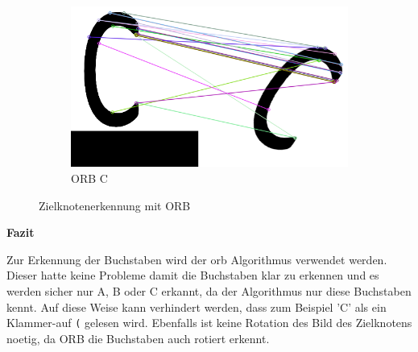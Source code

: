 \begin{figure}[H]
\begin{subfigure}{0.3\textwidth}
\label{fig:orb-b}
\end{subfigure}
\begin{subfigure}{0.3\textwidth}
\includegraphics[width=0.95\linewidth]{assets/informatik-prototyp/opencv/target_node_detection/orb-c.png} 
\caption{ORB C}
\label{fig:orb-c}
\end{subfigure}

\caption{Zielknotenerkennung mit ORB}
\label{fig:orb-zielknoten}
\end{figure}

\textbf{Fazit}

Zur Erkennung der Buchstaben wird der \acrshort{orb} Algorithmus verwendet werden. Dieser hatte keine Probleme damit die Buchstaben klar zu erkennen und es werden sicher nur A, B oder C erkannt, da der Algorithmus nur diese Buchstaben kennt. Auf diese Weise kann verhindert werden, dass zum Beispiel 'C' als ein Klammer-auf \verb|(| gelesen wird. Ebenfalls ist keine Rotation des Bild des Zielknotens noetig, da ORB die Buchstaben auch rotiert erkennt.